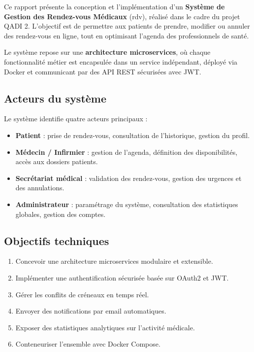 \documentclass[12pt,a4paper]{article}
\begin{document}
Ce rapport présente la conception et l'implémentation d'un \textbf{Système de Gestion des Rendez-vous Médicaux} (rdv), réalisé dans le cadre du projet QADI 2. L'objectif est de permettre aux patients de prendre, modifier ou annuler des rendez-vous en ligne, tout en optimisant l'agenda des professionnels de santé.

Le système repose sur une \textbf{architecture microservices}, où chaque fonctionnalité métier est encapsulée dans un service indépendant, déployé via Docker et communicant par des API REST sécurisées avec JWT.

\subsection{Acteurs du système}

Le système identifie quatre acteurs principaux :

\begin{itemize}[leftmargin=1.5cm]
  \item \textbf{Patient} : prise de rendez-vous, consultation de l'historique, gestion du profil.
  \item \textbf{Médecin / Infirmier} : gestion de l'agenda, définition des disponibilités, accès aux dossiers patients.
  \item \textbf{Secrétariat médical} : validation des rendez-vous, gestion des urgences et des annulations.
  \item \textbf{Administrateur} : paramétrage du système, consultation des statistiques globales, gestion des comptes.
\end{itemize}

\subsection{Objectifs techniques}

\begin{infobox}[Objectifs]
\begin{enumerate}[leftmargin=1cm]
  \item Concevoir une architecture microservices modulaire et extensible.
  \item Implémenter une authentification sécurisée basée sur OAuth2 et JWT.
  \item Gérer les conflits de créneaux en temps réel.
  \item Envoyer des notifications par email automatiques.
  \item Exposer des statistiques analytiques sur l'activité médicale.
  \item Conteneuriser l'ensemble avec Docker Compose.
\end{enumerate}
\end{infobox}
\end{document}

